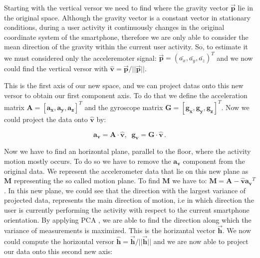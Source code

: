 Starting with the vertical versor we need to find where the gravity vector $\boldsymbol{\vec{p}}$ lie in the original space. Although the gravity vector is a constant vector in stationary conditions, during a user activity it continuously changes in the original coordinate system of the smartphone, therefore we are only able to consider the mean direction of the gravity within the current user activity. So, to estimate it we must considered only the acceleremoter signal: \mbox{$ \boldsymbol{\vec{p}} = (\bar{a_{x}}, \bar{a_{y}}, \bar{a_{z}})^{T}$}  and we now could find the vertical versor with \mbox{$ \boldsymbol{\hat{v}} = \boldsymbol{\vec{p}} / ||\boldsymbol{\vec{p}}|| $}.

This is the first axis of our new space, and we can project datas onto this new versor to obtain our first component axis. To do that we define the acceleration matrix \mbox{$\boldsymbol{A} = [ \boldsymbol{a_{x}}, \boldsymbol{a_{y}}, \boldsymbol{a_{z}} ]^{T}$} and the gyroscope matrix \mbox{$\boldsymbol{G} = [ \boldsymbol{g_{x}}, \boldsymbol{g_{y}}, \boldsymbol{g_{z}} ]^{T} $}. Now we could project the data onto $\boldsymbol{\hat{v}}$ by:

\begin{equation}
	\label{v-axis eq}
	 \boldsymbol{a_{v}} = \boldsymbol{A} \cdot \boldsymbol{\hat{v}} ,\;\; \boldsymbol{g_{v}} = \boldsymbol{G} \cdot \boldsymbol{\hat{v}} \,.
\end{equation}

Now we have to find an horizontal plane, parallel to the floor, where the activity motion mostly occurs. To do so we have to remove the  $\boldsymbol{a_{v}}$ component from the original data. We represent the accelerometer data that lie on this new plane as $\boldsymbol{M}$ representing the so called motion plane. To find $\boldsymbol{M}$ we have to: \mbox{$\boldsymbol{M} = \boldsymbol{A} - \boldsymbol{\hat{v}} \boldsymbol{a_{v}}^{T} $}. In this new plane, we could see that the direction with the largest variance of projected data, represents the main direction of motion, i.e in which direction the user is currently performing the activity with respect to the current smartphone orientation. By applying PCA \cite{rao1964use}, we are able to find the direction along which the variance of measurements is maximized. This is the horizantal vector $\boldsymbol{\vec{h}}$. We now could compute the horizontal versor \mbox{$ \boldsymbol{\hat{h}} = \boldsymbol{\vec{h}} / ||\boldsymbol{\vec{h}}|| $} and we are now able to project our data onto this second new axis:

